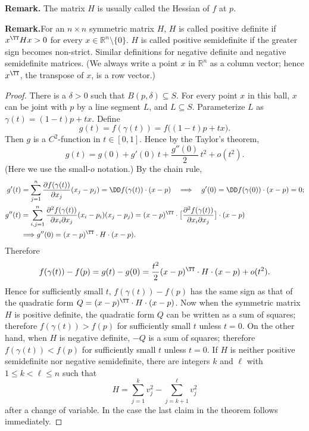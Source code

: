 \documentclass[11pt]{article}
\newcommand{\Rmk}{\textbf{Remark.}}
\begin{document}
\noindent\textbf{Remark.} The matrix $H$ is usually called the {\sffamily Hessian} of $f$
at $p$.

\medskip

\Rmk For an $n \times n$ symmetric matrix $H$, $H$ is called
{\sffamily positive definite} if $x^{\TT} H x > 0$ for every $x \in \mathbb{R}^n
\setminus \{ 0 \}$.  $H$ is called {\sffamily positive semidefinite}
if the greater sign becomes non-strict.  Similar definitions for
{\sffamily negative definite} and {\sffamily negative semidefinite}
matrices.  (We always write a point $x$ in $\mathbb{R}^n$ as a column
vector; hence $x^\TT$, the transpose of $x$, is a row vector.)

\begin{proof} 
  There is a $\delta > 0$ such that $B(p, \delta) \subseteq S$.
For every point $x$ in this ball, $x$ can be joint with $p$ by a
line segment $L$, and $L \subseteq S$.  Parameterize $L$ as $\gamma(t) = (1
- t) p + t x$.  Define
\begin{equation*}
  g(t) = f(\gamma(t)) = f\bigl( (1-t) p + t x \bigr).
\end{equation*}
Then $g$ is a $C^2$-function in $t \in [0,1]$.  Hence by the Taylor's
theorem,
\begin{equation*}
  g(t) = g(0) + g'(0) \, t + \frac{g''(0)}{2} \, t^2 + o(t^2).
\end{equation*}
(Here we use the small-$o$ notation.)  By the chain rule,
\begin{align*}
  g'(t) &= \sum_{j=1}^n \frac{\partial f(\gamma(t))}{\partial x_j} (x_j - p_j) = \DD f(\gamma(t))
  \cdot (x - p) \quad \Longrightarrow \quad g'(0) =
  \DD f(\gamma(0)) \cdot (x - p) = 0 ; \\
  g''(t) &= \sum_{i,j=1}^n \frac{\partial^2 f(\gamma(t))}{\partial x_i \partial x_j} (x_i - p_i) (x_j - p_j) = (x - p)^\TT \cdot \bigl[ \frac{\partial^2 f(\gamma(t))}{\partial x_i \partial x_j} \bigr]
  \cdot (x - p) \\ &\Longrightarrow g''(0) = (x - p)^\TT
  \cdot H \cdot (x - p).
\end{align*}
Therefore
\begin{equation*}
  f(\gamma(t)) - f(p) = g(t) - g(0) = \frac{t^2}{2} (x - p)^\TT \cdot H
  \cdot (x - p) + o(t^2).
\end{equation*}
Hence for sufficiently small $t$, $f(\gamma(t)) - f(p)$ has the same sign
as that of the quadratic form $Q = (x - p)^\TT \cdot H \cdot (x -
p)$.  Now when the symmetric matrix $H$ is positive definite, the
quadratic form $Q$ can be written as a sum of squares; therefore
$f(\gamma(t)) > f(p)$ for sufficiently small $t$ unless $t = 0$.  On the
other hand, when $H$ is negative definite, $-Q$ is a sum of squares;
therefore $f(\gamma(t)) < f(p)$ for sufficiently small $t$ unless $t =
0$.  If $H$ is neither positive semidefinite nor negative
semidefinite, there are integers $k$ and $\ell$ with $1 \leqslant k < \ell \leqslant n$ such that
\begin{equation*}
  H = \sum_{j=1}^k v_j^2 - \sum_{j=k+1}^\ell v_j^2
\end{equation*}
after a change of variable.  In the case the last claim in the theorem
follows immediately.  
\end{proof}
\end{document}
